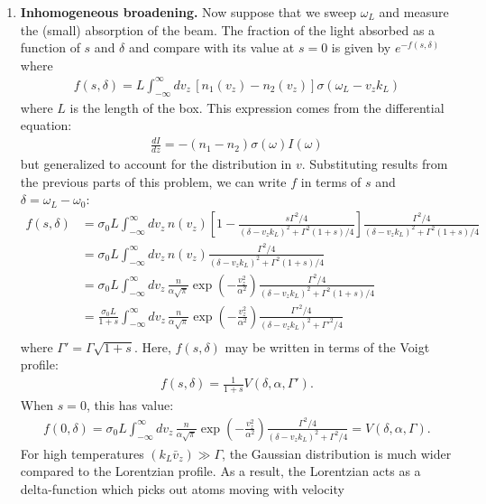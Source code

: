 \documentclass{article}
\theoremstyle{definition}
\newcommand{\al}{\alpha}
\newcommand{\f}[2]{\frac{#1}{#2}}
\newcommand{\lp}{\left(}
\newcommand{\rp}{\right)}
\newcommand{\lb}{\left[}
\newcommand{\rb}{\right]}
\begin{document}
\begin{enumerate}[label = (\alph*)]
	\item \textbf{Inhomogeneous broadening.} Now suppose  that we sweep $\omega_L$ and measure the (small)  absorption of the beam. The fraction of the light absorbed as a function of $s$ and $\delta$ and compare with its value at $s = 0$ is given by $e^{-f(s,\delta)}$ where
	\begin{align*}
	f(s,\delta) = L\int_{-\infty}^\infty dv_z\, \lb n_1(v_z) - n_2(v_z) \rb \sigma(\omega_L-v_z k_L) 
	\end{align*}
	where $L$ is the length of the box. This expression comes from the differential equation:
	\begin{align*}
	\f{dI}{dz} = -(n_1 - n_2)\sigma(\omega) I(\omega)
	\end{align*}
	but generalized to account for the distribution in $v$. Substituting results from the previous parts of this problem, we can write $f$ in terms of $s$ and $\delta = \omega_L - \omega_0$:
	\begin{align*}
	f(s,\delta)
	&= \sigma_0 L \int_{-\infty}^\infty dv_z\, n(v_z) \lb 1 - \f{s\Gamma^2/4}{(\delta - v_z k_L)^2 + \Gamma^2(1+s)/4} \rb \f{\Gamma^2/4}{(\delta - v_zk_L)^2 + \Gamma^2(1+s)/4} \\
	&= \sigma_0 L  \int_{-\infty}^\infty dv_z\,  n(v_z) \f{\Gamma^2/4}{(\delta - v_z k_L)^2 + \Gamma^2(1+s)/4}\\
	&= \sigma_0 L \int_{-\infty}^\infty dv_z\, \f{n}{\al\sqrt{\pi}} \exp\lp -\f{v_z^2}{\al^2} \rp \f{\Gamma^2/4}{(\delta - v_z k_L)^2 + \Gamma^2(1+s)/4}\\
	&=  \f{\sigma_0 L}{1+s} \int_{-\infty}^\infty dv_z\, \f{n}{\al\sqrt{\pi}} \exp\lp -\f{v_z^2}{\al^2} \rp \f{\Gamma'^2/4}{(\delta - v_z k_L)^2 + \Gamma'^2/4}\\
	\end{align*}
	where $\Gamma' = \Gamma\sqrt{1+s}$. Here, $f(s,\delta)$ may be written in terms of the Voigt profile:
	\begin{align*}
	f(s,\delta) = \f{1}{1+s}V(\delta, \al, \Gamma').
	\end{align*}
	When $s=0$, this has value:
	\begin{align*}
	f(0,\delta) =  \sigma_0 L \int_{-\infty}^\infty dv_z\, \f{n}{\al\sqrt{\pi}} \exp\lp -\f{v_z^2}{\al^2} \rp \f{\Gamma^2/4}{(\delta - v_z k_L)^2 + \Gamma^2/4} = V(\delta,\al,\Gamma).
 	\end{align*}
	For high temperatures $(k_L \bar{v}_z) \gg \Gamma$, the Gaussian distribution is much wider compared to the Lorentzian profile. As a result, the Lorentzian acts as a delta-function which picks out atoms moving with velocity

\end{enumerate}
\end{document}
